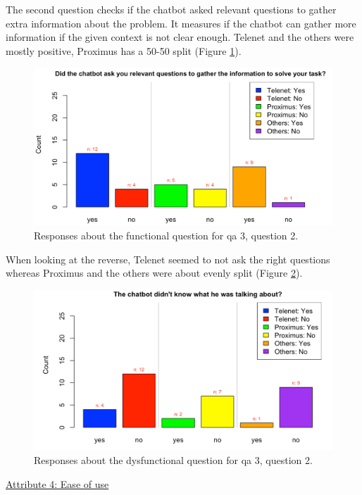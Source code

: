 \break
The second question checks if the chatbot asked relevant questions to gather extra information about the problem. It measures if the chatbot can gather more information if the given context is not clear enough. Telenet and the others were mostly positive, Proximus has a 50-50 split (Figure \ref{fig:Q3b}).\\
\begin{figure}[!htb]
	\centering
	\includegraphics[width=375pt]{../LaTeX/Figures/Comparative/Q3b.png}
	\caption{Responses about the functional question for \acrshort{qa} 3, question 2.}\label{fig:Q3b}
\end{figure}
\break
When looking at the reverse, Telenet seemed to not ask the right questions whereas Proximus and the others were about evenly split (Figure \ref{fig:DQ3b}).\\
\begin{figure}[!htb]
	\centering
	\includegraphics[width=375pt]{../LaTeX/Figures/Comparative/DQ3.png}
	\caption{Responses about the dysfunctional question for \acrshort{qa} 3, question 2.}\label{fig:DQ3b}
\end{figure}
\break 
\break
\break
\break
\break
\ul{Attribute 4: Ease of use}\\
